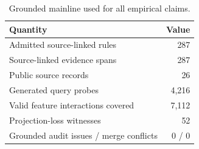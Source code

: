 \begin{table}[H]
\centering
\caption{Grounded mainline used for all empirical claims.}
\label{tab:snapshot}
\small
\begin{tabular}{lr}
\toprule
Quantity & Value \\
\midrule
Admitted source-linked rules & 287 \\
Source-linked evidence spans & 287 \\
Public source records & 26 \\
Generated query probes & 4,216 \\
Valid feature interactions covered & 7,112 \\
Projection-loss witnesses & 52 \\
Grounded audit issues / merge conflicts & 0 / 0 \\
\bottomrule
\end{tabular}
\end{table}
